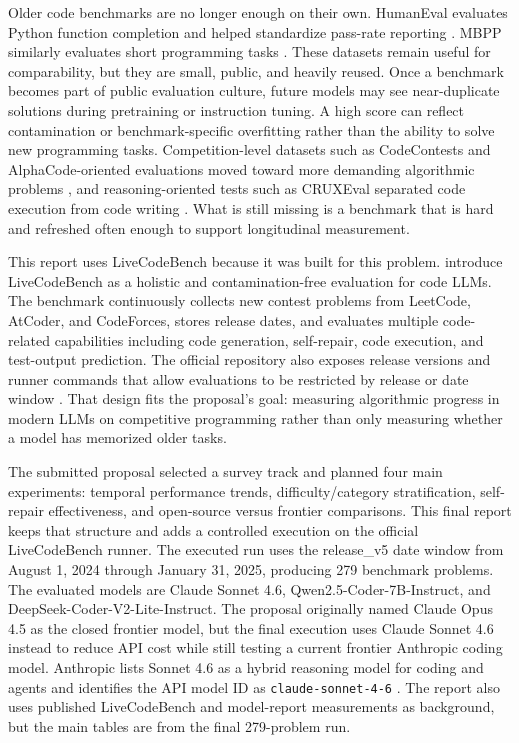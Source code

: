 \documentclass[11pt]{article}
\newcommand{\lcb}{LiveCodeBench}
\begin{document}
Older code benchmarks are no longer enough on their own. HumanEval evaluates Python function completion and helped standardize pass-rate reporting \citep{chen2021codex}. MBPP similarly evaluates short programming tasks \citep{austin2021program}. These datasets remain useful for comparability, but they are small, public, and heavily reused. Once a benchmark becomes part of public evaluation culture, future models may see near-duplicate solutions during pretraining or instruction tuning. A high score can reflect contamination or benchmark-specific overfitting rather than the ability to solve new programming tasks. Competition-level datasets such as CodeContests and AlphaCode-oriented evaluations moved toward more demanding algorithmic problems \citep{li2022competition}, and reasoning-oriented tests such as CRUXEval separated code execution from code writing \citep{gu2024cruxeval}. What is still missing is a benchmark that is hard and refreshed often enough to support longitudinal measurement.

This report uses \lcb{} because it was built for this problem. \citet{jain2025livecodebench} introduce \lcb{} as a holistic and contamination-free evaluation for code LLMs. The benchmark continuously collects new contest problems from LeetCode, AtCoder, and CodeForces, stores release dates, and evaluates multiple code-related capabilities including code generation, self-repair, code execution, and test-output prediction. The official repository also exposes release versions and runner commands that allow evaluations to be restricted by release or date window \citep{livecodebenchgithub}. That design fits the proposal's goal: measuring algorithmic progress in modern LLMs on competitive programming rather than only measuring whether a model has memorized older tasks.

The submitted proposal selected a survey track and planned four main experiments: temporal performance trends, difficulty/category stratification, self-repair effectiveness, and open-source versus frontier comparisons. This final report keeps that structure and adds a controlled execution on the official \lcb{} runner. The executed run uses the release\_v5 date window from August 1, 2024 through January 31, 2025, producing 279 benchmark problems. The evaluated models are Claude Sonnet 4.6, Qwen2.5-Coder-7B-Instruct, and DeepSeek-Coder-V2-Lite-Instruct. The proposal originally named Claude Opus 4.5 as the closed frontier model, but the final execution uses Claude Sonnet 4.6 instead to reduce API cost while still testing a current frontier Anthropic coding model. Anthropic lists Sonnet 4.6 as a hybrid reasoning model for coding and agents and identifies the API model ID as \texttt{claude-sonnet-4-6} \citep{anthropic2026sonnet46}. The report also uses published \lcb{} and model-report measurements as background, but the main tables are from the final 279-problem run.
\end{document}
